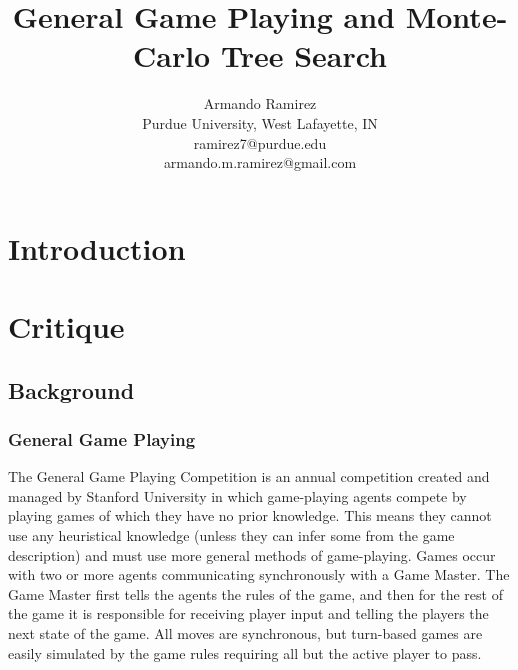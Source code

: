 \documentclass[letterpaper]{article}
\title{General Game Playing and Monte-Carlo Tree Search}
\author{Armando Ramirez \\ Purdue University, West Lafayette, IN \\ ramirez7@purdue.edu \\ armando.m.ramirez@gmail.com}
\begin{document}
\maketitle

\section{Introduction}
\section{Critique}

\subsection{Background}

\subsubsection{General Game Playing}
The General Game Playing Competition is an annual competition created and managed by Stanford University in which game-playing agents compete by playing games of which they have no prior knowledge.\cite{StanfordGGP} This means they cannot use any heuristical knowledge (unless they can infer some from the game description) and must use more general methods of game-playing. Games occur with two or more agents communicating synchronously with a Game Master. The Game Master first tells the agents the rules of the game, and then for the rest of the game it is responsible for receiving player input and telling the players the next state of the game. All moves are synchronous, but turn-based games are easily simulated by the game rules requiring all but the active player to pass.
\end{document}
